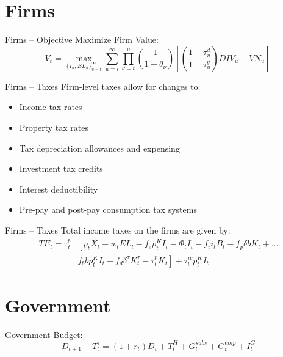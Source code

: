 \documentclass{beamer}
\begin{document}
\section{Firms}
  \begin{frame}{Firms -- Objective}
  Maximize Firm Value: \\
  \begin{equation}
         V_{t}= \max_{\{I_{u},EL_{u}\}^{\infty}_{u=t}}  \sum_{u=t}^{\infty} \prod_{\nu=t}^{u}\left(\frac{1}{1+\theta_{\nu}}\right)\left[ \left(\frac{1-\tau^{d}_{u}}{1-\tau^{g}_{u}}\right)DIV_{u}-VN_{u}\right]\
  \end{equation}
  \end{frame}

    \begin{frame}{Firms -- Taxes}
    Firm-level taxes allow for changes to:
\begin{itemize}
\item Income tax rates
\item Property tax rates
\item Tax depreciation allowances and expensing
\item Investment tax credits
\item Interest deductibility
\item Pre-pay and post-pay consumption tax systems
\end{itemize}
 \end{frame}

    \begin{frame}{Firms -- Taxes}
    Total income taxes on the firms are given by:
  \begin{equation}
\label{eqn:corp_tax}
\begin{split}
TE_{t}=  \tau^{b}_{t} & \left[  p_{t}X_{t}-w_{t}EL_{t}-f_{e}p^{K}_{t}I_{t}-\Phi_{t}I_{t}-f_{i}i_{t}B_{t}-f_{p}\delta b K_{t}+... \right. \\
 &  \left.  f_{b}bp^{K}_{t}I_{t}-f_{d}\delta^{\tau}K^{\tau}_{t}-\tau^{p}_{t}K_{t}\right] +\tau^{ic}_{t}p^{K}_{t}I_{t}
\end{split}
\end{equation}
 \end{frame}


\section{Government}
  \begin{frame}{Government Budget:}
  \begin{equation}
 \label{eqn:gbc}
      D_{t+1} + T^{\tau}_{t} = (1+r_{t})D_{t} + T^{H}_{t} + G^{subs}_{t} + G^{emp}_{t} + I^{G}_{t}
      \end{equation}
  \end{frame}
\end{document}
